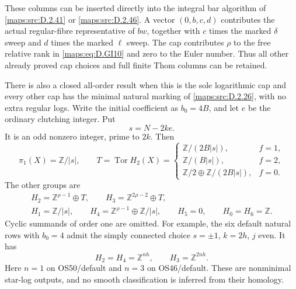 \begin{theorem}
These columns can be inserted directly into the integral
bar algorithm of \ref{maps:src:D.2.41} or \ref{maps:src:D.2.46}. A vector $(0,b,c,d)$
contributes the actual regular-fibre representative of
$bw$, together with $c$ times the marked $\delta$ sweep
and $d$ times the marked $\ell$ sweep. The cap contributes
$\rho$ to the free relative rank in \eqref{maps:eq:D.GI10} and zero to
the Euler number. Thus all other already proved cap
choices and full finite Thom columns can be retained.

There is also a closed all-order result when this is the
sole logarithmic cap and every other cap has the minimal
natural marking of \ref{maps:src:D.2.26}, with no extra regular logs.
Write the initial coefficient as $b_0=4B$, and let $e$
be the ordinary clutching integer. Put
\[
                         s=N-2ke .                       \tag{D.SL6}\label{maps:eq:D.SL6}
\]
It is an odd nonzero integer, prime to $2k$. Then
\[
 \pi_1(X)=\mathbb Z/|s|,\qquad
 T=\operatorname{Tor}H_2(X)=
 \begin{cases}
 \mathbb Z/(2B|s|),&f=1,\\
 \mathbb Z/(B|s|),&f=2,\\
 \mathbb Z/2\oplus\mathbb Z/(2B|s|),&f=0.
 \end{cases}                                             \tag{D.SL7}\label{maps:eq:D.SL7}
\]
The other groups are
\[
\begin{gathered}
 H_2=\mathbb Z^{\rho-1}\oplus T,\qquad
 H_3=\mathbb Z^{2\rho-2}\oplus T,\\
 H_1=\mathbb Z/|s|,\qquad
 H_4=\mathbb Z^{\rho-1}\oplus\mathbb Z/|s|,\qquad H_5=0,
 \qquad H_0=H_6=\mathbb Z .
\end{gathered}                                             \tag{D.SL8}\label{maps:eq:D.SL8}
\]
Cyclic summands of order one are omitted. For example,
the six default natural rows with $b_0=4$ admit the
simply connected choice $s=\pm1$, $k=2h$, $j$ even.
It has
\[
          H_2=H_4=\mathbb Z^{nh},\qquad
                         H_3=\mathbb Z^{2nh}.              \tag{D.SL9}\label{maps:eq:D.SL9}
\]
Here $n=1$ on OS50/default and $n=3$ on OS46/default.
These are nonminimal star-log outputs, and no smooth
classification is inferred from their homology.

\end{theorem}


